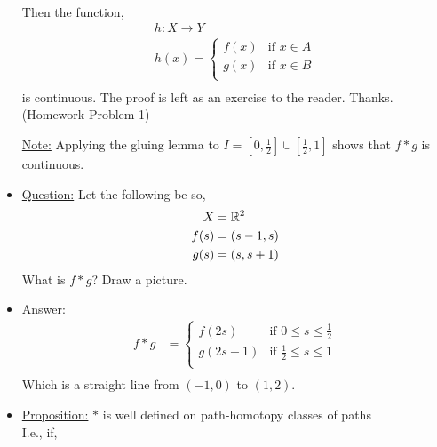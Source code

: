 \begin{itemize}
\begin{theorem}
\begin{minipage}[c]{\linewidth}
\begin{center}
                            \end{center}
                        \end{minipage}\\ 
                    Then the function,\\
            \begin{align*}
                h: X\rightarrow Y\\
                h(x)=\begin{cases}
                    f(x) & \text{if } x\in A\\
                    g(x) & \text{if } x\in B\\
                \end{cases}\\
            \end{align*}
            is continuous. The proof is left as an exercise to the reader. Thanks. (Homework Problem 1)\\
        \end{theorem}
            \underline{Note:} Applying the gluing lemma to $I = [0,\frac{1}{2}]\cup [\frac{1}{2}, 1]$ shows
            that $f*g$ is continuous.
        \item \underline{Question:} Let the following be so,
            \begin{align*}
                X &= \mathbb{R}^2\\
                f(s)&=(s-1,s)\\
                g(s)&=(s,s+1)\\
            \end{align*}
            What is $f*g$? Draw a picture.
        \item \underline{Answer:} 
            \begin{align*}
                f*g &= \begin{cases}
                    f(2s) & \text{if }0\leq s \le \frac{1}{2}\\
                    g(2s-1) & \text{if }\frac{1}{2}\leq s \le 1\\
                \end{cases}\\
            \end{align*}
            Which is a straight line from $(-1,0)$ to $(1,2)$.
        \item \underline{Proposition:} $*$ is well defined on path-homotopy classes of paths\\
            I.e., if,
            \begin{align*}

\end{align*}
\end{itemize}
